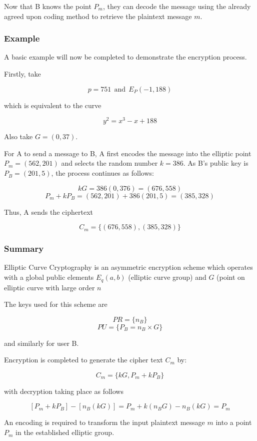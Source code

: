 \documentclass[a4paper,12pt]{report}
\begin{document}
Now that B knows the point $P_{m}$, they can decode the message using the already agreed upon coding method to retrieve the plaintext message $m$.

\subsubsection{Example}

A basic example will now be completed to demonstrate the encryption process. 

Firstly, take 

\[p = 751 \: \: \mathrm{and} \: \: E_{P}(-1,188)\]

which is equivalent to the curve 

\[y^2 = x^3 - x + 188\]

 Also take $G = (0,37)$.

For A to send a message to B, A first encodes the message into the elliptic point $P_{m} = (562,201)$ and selects the random number $k = 386$. As B's public key is $P_{B} = (201,5)$, the process continues as follows:

\[ kG = 386(0,376) = (676,558) \]
\[ P_{m} + kP_{B} = (562,201) + 386(201,5) = (385,328) \]

Thus, A sends the ciphertext

\[ C_{m} = \{(676,558),(385,328)\} \]

\subsubsection{Summary}

Elliptic Curve Cryptography is an asymmetric encryption scheme which operates with a global public elements $E_{q}(a,b)$ (elliptic curve group) and $G$ (point on elliptic curve with large order $n$

The keys used for this scheme are

\[PR = \{n_{B}\} \]\[PU = \{P_{B} = n_{B} \times G\} \]

and similarly for user B.

Encryption is completed to generate the cipher text $C_{m}$ by:

\[ C_{m} = \{kG , P_{m} + kP_{B}\} \]

with decryption taking place as follows

\[ [P_{m} + kP_{B}] - [n_{B}(kG)] = P_{m} + k(n_{B}G) - n_{B}(kG) = P_{m} \]

An encoding is required to transform the input plaintext message $m$ into a point $P_{m}$ in the established elliptic group.
\end{document}

